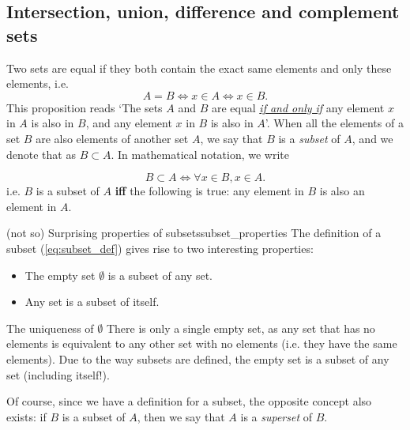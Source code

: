 \subsection{Intersection, union, difference and complement sets}

Two sets are equal if they both contain the exact same elements and only these elements, i.e.
\begin{equation}
	A = B \Longleftrightarrow x\in A \Leftrightarrow x\in B.
	\label{eq:set_equality}
\end{equation}
This proposition reads `The sets $A$ and $B$ are equal \underline{\textit{if and only if}} any element $x$ in $A$ is also in $B$, and any element $x$ in $B$ is also in $A$'. When all the elements of a set $B$ are also elements of another set $A$, we say that $B$ is a \emph{subset} of $A$, and we denote that as $B\subset A$. In mathematical notation, we write

\begin{equation}
	B\subset A \Leftrightarrow \forall x\in B, x\in A.
	\label{eq:subset_def}
\end{equation}
i.e. $B$ is a subset of $A$ \textbf{iff} the following is true: any element in $B$ is also an element in $A$.

\begin{note}{(not so) Surprising properties of subsets}{subset_properties}
	The definition of a subset (\autoref{eq:subset_def}) gives rise to two interesting properties:
	\begin{itemize}
		\item The empty set $\emptyset$ is a subset of any set.
		\item Any set is a  subset of itself.  %
	\end{itemize}
\end{note}

\begin{note}{The uniqueness of $\emptyset$}{}
	There is only a single empty set, as any set that has no elements is equivalent to any other set with no elements (i.e. they have the same elements). Due to the way subsets are defined, the empty set is a subset of any set (including itself!).
\end{note}

Of course, since we have a definition for a subset, the opposite concept also exists: if $B$ is a subset of $A$, then we say that $A$ is a \emph{superset} of $B$.

